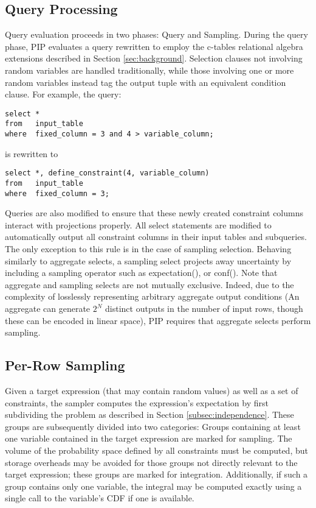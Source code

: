\subsection{Query Processing}
Query evaluation proceeds in two phases: Query and Sampling.  During the query phase, PIP evaluates a query rewritten to employ the c-tables relational algebra extensions described in Section \ref{sec:background}.  Selection clauses not involving random variables are handled traditionally, while those involving one or more random variables instead tag the output tuple with an equivalent condition clause.  For example, the query:

\begin{verbatim}
select *
from   input_table
where  fixed_column = 3 and 4 > variable_column;
\end{verbatim}
%
is rewritten to
%
\begin{verbatim}
select *, define_constraint(4, variable_column)
from   input_table
where  fixed_column = 3;
\end{verbatim}

Queries are also modified to ensure that these newly created constraint columns interact with projections properly.  All select statements are modified to automatically output all constraint columns in their input tables and subqueries.  The only exception to this rule is in the case of sampling selection.  Behaving similarly to aggregate selects, a sampling select projects away uncertainty by including a sampling operator such as expectation(), or conf().  Note that aggregate and sampling selects are not mutually exclusive.  Indeed, due to the complexity of losslessly representing arbitrary aggregate output conditions (An aggregate can generate $2^{N}$ distinct outputs in the number of input rows, though these can be encoded in linear space), PIP requires that aggregate selects perform sampling. 

\subsection{Per-Row Sampling}
Given a target expression (that may contain random values) as well as a set of constraints, the sampler computes the expression's expectation by first subdividing the problem as described in Section \ref{subsec:independence}.  These groups are subsequently divided into two categories: Groups containing at least one variable contained in the target expression are marked for sampling.  The volume of the probability space defined by all constraints must be computed, but storage overheads may be avoided for those groups not directly relevant to the target expression; these groups are marked for integration.  Additionally, if such a group contains only one variable, the integral may be computed exactly using a single call to the variable's CDF if one is available.

